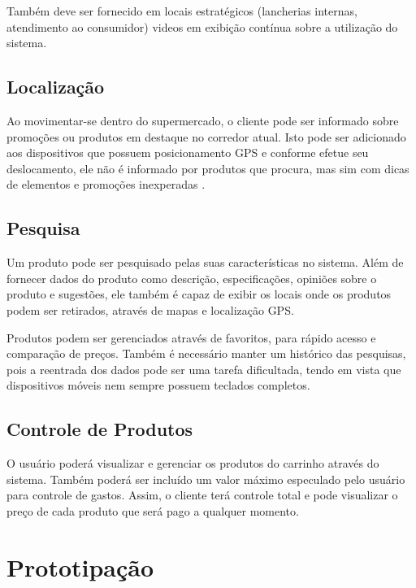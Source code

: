 \documentclass{article}
\begin{document}
Também deve ser fornecido em locais estratégicos (lancherias internas,
atendimento ao consumidor) videos em exibição contínua sobre a utilização do
sistema.

\subsection{Localização}


Ao movimentar-se dentro do supermercado, o cliente pode ser informado sobre
promoções ou produtos em destaque no corredor atual. Isto pode ser adicionado
aos dispositivos que possuem posicionamento GPS e conforme efetue seu
deslocamento, ele não é informado por produtos que procura, mas sim com dicas de
elementos e promoções inexperadas \cite{canny2006}.

\subsection{Pesquisa}


Um produto pode ser pesquisado pelas suas características no sistema. Além de
fornecer dados do produto como descrição, especificações, opiniões sobre o
produto e sugestões, ele também é capaz de exibir os locais onde os produtos
podem ser retirados, através de mapas e localização GPS.


Produtos podem ser gerenciados através de favoritos, para rápido acesso e
comparação de preços. Também é necessário manter um histórico das pesquisas,
pois a reentrada dos dados pode ser uma tarefa dificultada, tendo em vista que
dispositivos móveis nem sempre possuem teclados completos.

\subsection{Controle de Produtos}


O usuário poderá visualizar e gerenciar os produtos do carrinho através do
sistema. Também poderá ser incluído um valor máximo especulado pelo usuário para
controle de gastos. Assim, o cliente terá controle total e pode visualizar o
preço de cada produto que será pago a qualquer momento.

\section{Prototipação}
\label{sec:prototipacao}
\end{document}
